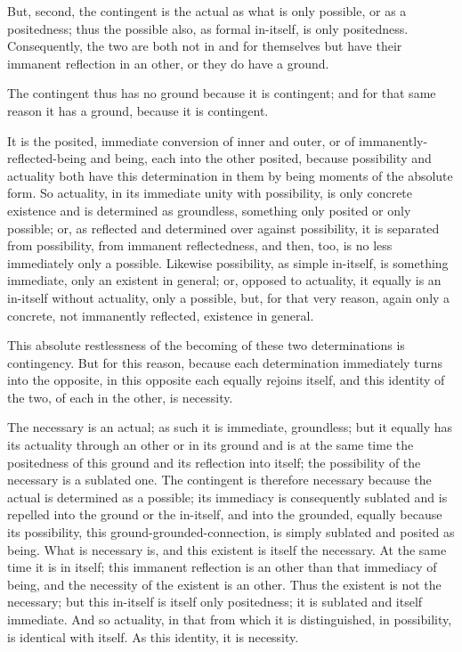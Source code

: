 But, second, the contingent is the actual
as what is only possible, or as a positedness;
thus the possible also, as formal in-itself, is only positedness.
Consequently, the two are both not in and for themselves
but have their immanent reflection in an other,
or they do have a ground.

The contingent thus has no ground because it is contingent;
and for that same reason it has a ground, because it is contingent.

It is the posited, immediate conversion of inner and outer,
or of immanently-reflected-being and being, each into the other posited,
because possibility and actuality both have this determination in them
by being moments of the absolute form.
So actuality, in its immediate unity with possibility,
is only concrete existence and is determined as groundless,
something only posited or only possible;
or, as reflected and determined over against possibility,
it is separated from possibility,
from immanent reflectedness, and then, too, is
no less immediately only a possible.
Likewise possibility, as simple in-itself, is something immediate,
only an existent in general;
or, opposed to actuality, it equally is an in-itself
without actuality, only a possible,
but, for that very reason, again only a concrete,
not immanently reflected, existence in general.

This absolute restlessness of the becoming of
these two determinations is contingency.
But for this reason, because each determination
immediately turns into the opposite,
in this opposite each equally rejoins itself,
and this identity of the two,
of each in the other, is necessity.

The necessary is an actual;
as such it is immediate, groundless;
but it equally has its actuality through an other or in its ground
and is at the same time the positedness of this ground
and its reflection into itself;
the possibility of the necessary is a sublated one.
The contingent is therefore necessary
because the actual is determined as a possible;
its immediacy is consequently sublated
and is repelled into the ground or the in-itself,
and into the grounded, equally because its possibility,
this ground-grounded-connection, is simply sublated and posited as being.
What is necessary is, and this existent is itself the necessary.
At the same time it is in itself;
this immanent reflection is an other than that immediacy of being,
and the necessity of the existent is an other.
Thus the existent is not the necessary;
but this in-itself is itself only positedness;
it is sublated and itself immediate.
And so actuality, in that from which it is distinguished,
in possibility, is identical with itself.
As this identity, it is necessity.


